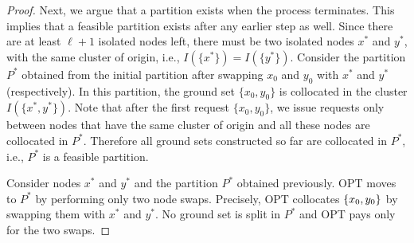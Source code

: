 \documentclass[a4paper,anonymous,USenglish]{lipics-v2019}
\newcommand{\OPT}{\textsc{OPT}\xspace}
\newcommand{\ALG}{\textsc{ALG}\xspace}
\DeclarePairedDelimiter\set{\{}{\}}
\begin{document}
\begin{proof}
	  Next, we argue that a partition exists when the process terminates.
	 This implies that a feasible partition exists after any earlier step as well.
	 Since there are at least $\ell+1$ isolated nodes left,
	 there must be two isolated nodes $x^*$ and $y^*$,
	  with the same cluster of origin,
	 i.e., $I(\{x^*\}) = I(\{y^*\})$.
	 Consider the partition $P^*$
	  obtained from the initial partition after swapping $x_0$ and $y_0$
	 with $x^*$ and $y^*$ (respectively).
	 In this partition,
	 the ground set $\{x_0,y_0\}$ is collocated in the cluster $I(\{x^*,y^*\})$.
	 Note that after the first request $\{x_0,y_0\}$,
	   we issue requests only between nodes that have the same cluster of origin and
	   all these nodes are collocated in $P^*$.
	 Therefore all ground sets constructed so far are collocated in  $P^*$,
	 i.e., $P^*$ is a feasible partition.
	
%

	Consider  nodes $x^*$ and $y^*$ and the partition $P^*$ obtained previously.
	\OPT moves to $P^*$ by performing only two node swaps.
	Precisely, \OPT collocates $\set{x_0,y_0}$ 
	by swapping them with $x^*$ and $y^*$.
	No ground set is split in $P^*$ and
	 \OPT pays only for the two swaps.


\end{proof}
\end{document}
